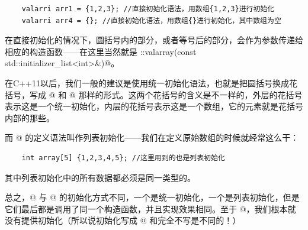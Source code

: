 \begin{lstlisting}
    valarri arr1 = {1,2,3}; //直接初始化语法，用数组{1,2,3}进行初始化
    valarri arr4 = {}; //直接初始化语法，用数组{}进行初始化，其中数组为空
\end{lstlisting}\par
在直接初始化的情况下，圆括号内的部分，或者等号后的部分，会作为参数传递给相应的构造函数——在这里当然就是 \lstinline@valarray::valarray(const std::initializer_list<int>&)@。\par
在C++11以后，我们一般的建议是使用统一初始化语法，也就是把圆括号换成花括号，写成 @ 和 @ 那样的形式。这两个花括号的含义是不一样的，外层的花括号表示这是一个统一初始化，内层的花括号表示这是一个数组，它的元素就是花括号内部的那些。\par
而 @ 的定义语法叫作列表初始化——我们在定义原始数组的时候就经常这么干：
\begin{lstlisting}
    int array[5] {1,2,3,4,5}; //这里用到的也是列表初始化
\end{lstlisting}
其中列表初始化中的所有数据都必须是同一类型的。\par
总之，@ 与 @ 的初始化方式不同，一个是统一初始化，一个是列表初始化，但是它们最后都是调用了同一个构造函数，并且实现效果相同。至于 @，我们根本就没有提供初始化（所以说初始化写成 \lstinline@{}@ 和完全不写是不同的！）
